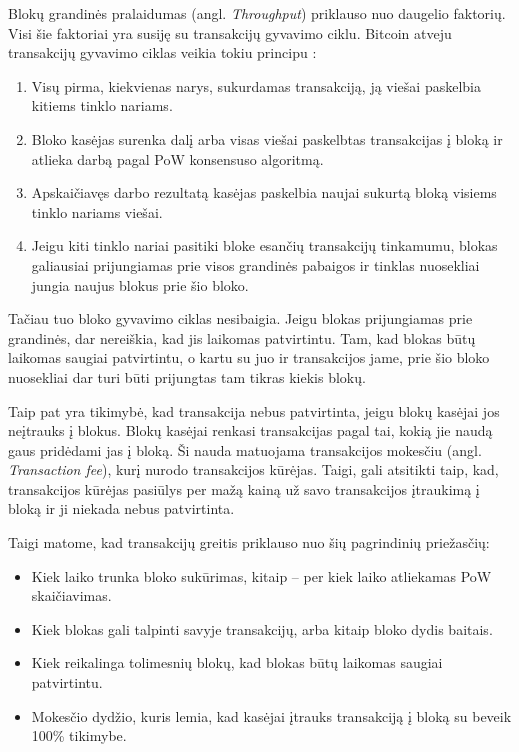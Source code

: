 

Blokų grandinės pralaidumas (angl. \textit{Throughput}) priklauso nuo daugelio faktorių. Visi šie faktoriai yra susiję su transakcijų gyvavimo ciklu. Bitcoin atveju transakcijų gyvavimo ciklas veikia tokiu principu \cite{nakamoto2008bitcoin}:
\begin{enumerate}
    \item Visų pirma, kiekvienas narys, sukurdamas transakciją, ją viešai paskelbia kitiems tinklo nariams. 
    \item Bloko kasėjas surenka dalį arba visas viešai paskelbtas transakcijas į bloką ir atlieka darbą pagal PoW konsensuso algoritmą.
    \item Apskaičiavęs darbo rezultatą kasėjas paskelbia naujai sukurtą bloką visiems tinklo nariams viešai. 
    \item Jeigu kiti tinklo nariai pasitiki bloke esančių transakcijų tinkamumu, blokas galiausiai prijungiamas prie visos grandinės pabaigos ir tinklas nuosekliai jungia naujus blokus prie šio bloko. 
\end{enumerate}

Tačiau tuo bloko gyvavimo ciklas nesibaigia. Jeigu blokas prijungiamas prie grandinės, dar nereiškia, kad jis laikomas patvirtintu. Tam, kad blokas būtų laikomas saugiai patvirtintu, o kartu su juo ir transakcijos jame, prie šio bloko nuosekliai dar turi būti prijungtas tam tikras kiekis blokų. 

Taip pat yra tikimybė, kad transakcija nebus patvirtinta, jeigu blokų kasėjai jos neįtrauks į blokus. Blokų kasėjai renkasi transakcijas pagal tai, kokią jie naudą gaus pridėdami jas į bloką. Ši nauda matuojama transakcijos mokesčiu (angl. \textit{Transaction fee}), kurį nurodo transakcijos kūrėjas. Taigi, gali atsitikti taip, kad, transakcijos kūrėjas pasiūlys per mažą kainą už savo transakcijos įtraukimą į bloką ir ji niekada nebus patvirtinta.

Taigi matome, kad transakcijų greitis priklauso nuo šių pagrindinių priežasčių: 
\begin{itemize}
    \item Kiek laiko trunka bloko sukūrimas, kitaip – per kiek laiko atliekamas PoW skaičiavimas.
    \item Kiek blokas gali talpinti savyje transakcijų, arba kitaip bloko dydis baitais.
    \item Kiek reikalinga tolimesnių blokų, kad blokas būtų laikomas saugiai patvirtintu.
    \item Mokesčio dydžio, kuris lemia, kad kasėjai įtrauks transakciją į bloką su beveik 100\% tikimybe.
\end{itemize} 


